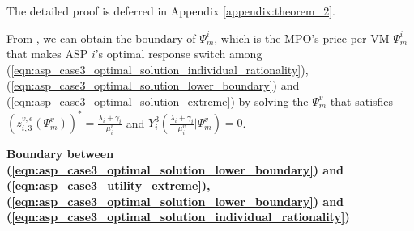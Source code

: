 \documentclass[10pt,journal, compsoc]{IEEEtran}
\begin{document}
The detailed proof is deferred in Appendix \ref{appendix:theorem_2}.

From , we can obtain the boundary of $\Psi_m^i$, which is the MPO's price per VM $\Psi_m^i$ that makes ASP $i$'s optimal response switch among (\ref{eqn:asp_case3_optimal_solution_individual_rationality}), (\ref{eqn:asp_case3_optimal_solution_lower_boundary}) and (\ref{eqn:asp_case3_optimal_solution_extreme}) by solving the $\Psi_m^v$ that satisfies $(z_{i,3}^{v,e}(\Psi_m^v))^* = \frac{\lambda_i+\gamma_i}{\mu_i^v}$ and $Y_i^3(\frac{\lambda_i+\gamma_i}{\mu_i^v}|\Psi_m^v) = 0$.

\textbf{Boundary between (\ref{eqn:asp_case3_optimal_solution_lower_boundary}) and (\ref{eqn:asp_case3_utility_extreme}), (\ref{eqn:asp_case3_optimal_solution_lower_boundary}) and (\ref{eqn:asp_case3_optimal_solution_individual_rationality})}
\end{document}
